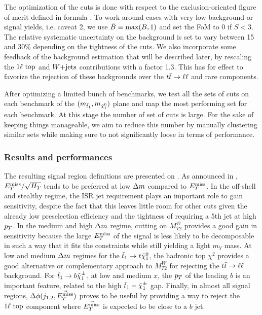     The optimization of the cuts is done with respect to the exclusion-oriented figure of
    merit defined in formula . To work around cases with very low background or signal yields,
    i.e. caveat 2, we use $\tilde{B} \equiv \text{max}(B,1)$ and set the FoM to 0
    if $S < 3$. The relative systematic uncertainty on the background is set to vary between
    15 and 30\% depending on the tightness of the cuts. We also incorporate some feedback
    of the background estimation that will be described later, by rescaling the $1\ell~\text{top}$
    and $\text{$W$+jets}$ contributions with a factor 1.3. This has for effect to favorize the
    rejection of these backgrounds over the $t\bar{t} \rightarrow \ell \ell$ and rare components.

    After optimizing a limited bunch of benchmarks, we test all the sets of cuts on each
    benchmark of the $(m_{\tilde{t}_1},m_{\tilde{\chi}_1^0})$ plane and map the
    most performing set for each benchmark. At this stage the number of set of cuts is
    large. For the sake of keeping things manageable, we aim to reduce this number by
    manually clustering similar sets while making sure to not significantly loose in
    terms of performance.

        \subsubsection{Results and performances \label{sec:cutAndCountPerformances}}

    The resulting signal region definitions are presented on .
    As announced in , $E_T^\text{miss}/\sqrt{H_T}$ tends to be
    preferred at low $\Delta m$ compared to $E_T^\text{miss}$. In the off-shell and stealthy regime,
    the ISR jet requirement plays an important role to gain sensitivity, despite the
    fact that this leaves little room for other cuts given the already low preselection
    efficiency and the tightness of requiring a 5th jet at high $p_T$.
    In the medium and high $\Delta m$ regime, cutting on $M_{T2}^W$ provides a good gain
    in sensitivity because the large $E_T^\text{miss}$ of the signal is less likely to be decomposable
    in such a way that it fits the constraints while still yielding a light $m_Y$ mass.
    At low and medium $\Delta m$ regimes for the $\tilde{t}_1 \rightarrow t \tilde{\chi}_1^0$, the
    hadronic top $\chi^2$ provides a good alternative or complementary approach to $M_{T2}^{W}$
    for rejecting the $t\bar{t} \rightarrow \ell \ell$ background. For $\tilde{t}_1 \rightarrow b \tilde{\chi}_1^\pm$,
    at low and medium $x$, the $p_T$ of the leading $b$ is an important feature, related
    to the high $\tilde{t}_1-\tilde{\chi}_1^\pm$ gap. Finally, in almost all signal regions,
    $\Delta\phi(j_{1,2},\vec{E_T^\text{miss}})$ proves to be useful by providing a way to reject the
    $1\ell~\text{top}$ component where $\vec{E_T^\text{miss}}$ is expected to be close to a $b$ jet.

